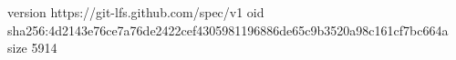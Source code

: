 version https://git-lfs.github.com/spec/v1
oid sha256:4d2143e76ce7a76de2422cef4305981196886de65c9b3520a98c161cf7bc664a
size 5914
